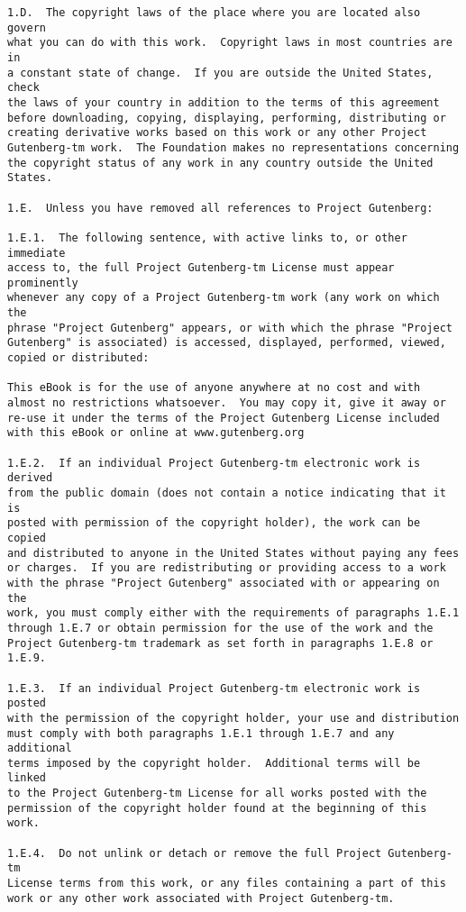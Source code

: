 \begin{Verbatim}[fontsize=\footnotesize]
1.D.  The copyright laws of the place where you are located also govern
what you can do with this work.  Copyright laws in most countries are in
a constant state of change.  If you are outside the United States, check
the laws of your country in addition to the terms of this agreement
before downloading, copying, displaying, performing, distributing or
creating derivative works based on this work or any other Project
Gutenberg-tm work.  The Foundation makes no representations concerning
the copyright status of any work in any country outside the United
States.

1.E.  Unless you have removed all references to Project Gutenberg:

1.E.1.  The following sentence, with active links to, or other immediate
access to, the full Project Gutenberg-tm License must appear prominently
whenever any copy of a Project Gutenberg-tm work (any work on which the
phrase "Project Gutenberg" appears, or with which the phrase "Project
Gutenberg" is associated) is accessed, displayed, performed, viewed,
copied or distributed:

This eBook is for the use of anyone anywhere at no cost and with
almost no restrictions whatsoever.  You may copy it, give it away or
re-use it under the terms of the Project Gutenberg License included
with this eBook or online at www.gutenberg.org

1.E.2.  If an individual Project Gutenberg-tm electronic work is derived
from the public domain (does not contain a notice indicating that it is
posted with permission of the copyright holder), the work can be copied
and distributed to anyone in the United States without paying any fees
or charges.  If you are redistributing or providing access to a work
with the phrase "Project Gutenberg" associated with or appearing on the
work, you must comply either with the requirements of paragraphs 1.E.1
through 1.E.7 or obtain permission for the use of the work and the
Project Gutenberg-tm trademark as set forth in paragraphs 1.E.8 or
1.E.9.

1.E.3.  If an individual Project Gutenberg-tm electronic work is posted
with the permission of the copyright holder, your use and distribution
must comply with both paragraphs 1.E.1 through 1.E.7 and any additional
terms imposed by the copyright holder.  Additional terms will be linked
to the Project Gutenberg-tm License for all works posted with the
permission of the copyright holder found at the beginning of this work.

1.E.4.  Do not unlink or detach or remove the full Project Gutenberg-tm
License terms from this work, or any files containing a part of this
work or any other work associated with Project Gutenberg-tm.


\end{Verbatim}
